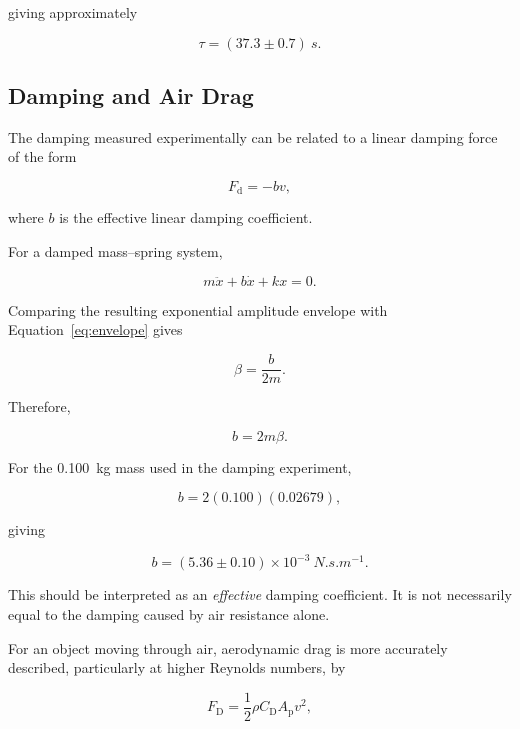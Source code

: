 \documentclass[12pt,a4paper]{article}
\begin{document}
giving approximately

\begin{equation}
\boxed{\tau=(37.3\pm0.7)\ \si{s}}.
\end{equation}

\subsection{Damping and Air Drag}

The damping measured experimentally can be related to a linear damping force of the form

\begin{equation}
F_{\mathrm{d}}=-bv,
\label{eq:linear_drag}
\end{equation}

where $b$ is the effective linear damping coefficient.

For a damped mass--spring system,

\begin{equation}
m\ddot{x}+b\dot{x}+kx=0.
\end{equation}

Comparing the resulting exponential amplitude envelope with Equation~\ref{eq:envelope} gives

\begin{equation}
\beta=\frac{b}{2m}.
\end{equation}

Therefore,

\begin{equation}
b=2m\beta.
\label{eq:b_beta}
\end{equation}

For the \SI{0.100}{kg} mass used in the damping experiment,

\begin{equation}
b=2(0.100)(0.02679),
\end{equation}

giving

\begin{equation}
\boxed{
b=(5.36\pm0.10)\times10^{-3}\ \si{N.s.m^{-1}}
}.
\end{equation}

This should be interpreted as an \textit{effective} damping coefficient. It is not necessarily equal to the damping caused by air resistance alone.

For an object moving through air, aerodynamic drag is more accurately described, particularly at higher Reynolds numbers, by

\begin{equation}
F_{\mathrm{D}}
=
\frac{1}{2}\rho C_{\mathrm{D}}A_{\mathrm{p}}v^2,
\label{eq:quadratic_drag}
\end{equation}
\end{document}
